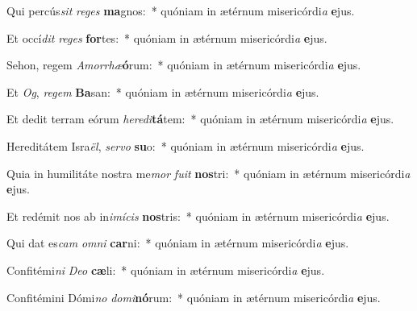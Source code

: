 \item Qui percús\textit{sit} \textit{re}\textit{ges} \textbf{ma}gnos:~* quóniam in ætérnum misericórdi\textit{a} \textbf{e}jus.
\item Et occí\textit{dit} \textit{re}\textit{ges} \textbf{for}tes:~* quóniam in ætérnum misericórdi\textit{a} \textbf{e}jus.
\item Sehon, regem \textit{A}\textit{mor}\textit{rhæ}\textbf{ó}rum:~* quóniam in ætérnum misericórdi\textit{a} \textbf{e}jus.
\item Et \textit{Og}, \textit{re}\textit{gem} \textbf{Ba}san:~* quóniam in ætérnum misericórdi\textit{a} \textbf{e}jus.
\item Et dedit terram eórum \textit{he}\textit{re}\textit{di}\textbf{tá}tem:~* quóniam in ætérnum misericórdi\textit{a} \textbf{e}jus.
\item Hereditátem Isra\textit{ël}, \textit{ser}\textit{vo} \textbf{su}o:~* quóniam in ætérnum misericórdi\textit{a} \textbf{e}jus.
\item Quia in humilitáte nostra me\textit{mor} \textit{fu}\textit{it} \textbf{nos}tri:~* quóniam in ætérnum misericórdi\textit{a} \textbf{e}jus.
\item Et redémit nos ab in\textit{i}\textit{mí}\textit{cis} \textbf{nos}tris:~* quóniam in ætérnum misericórdi\textit{a} \textbf{e}jus.
\item Qui dat es\textit{cam} \textit{om}\textit{ni} \textbf{car}ni:~* quóniam in ætérnum misericórdi\textit{a} \textbf{e}jus.
\item Confitémi\textit{ni} \textit{De}\textit{o} \textbf{cæ}li:~* quóniam in ætérnum misericórdi\textit{a} \textbf{e}jus.
\item Confitémini Dómi\textit{no} \textit{do}\textit{mi}\textbf{nó}rum:~* quóniam in ætérnum misericórdi\textit{a} \textbf{e}jus.
